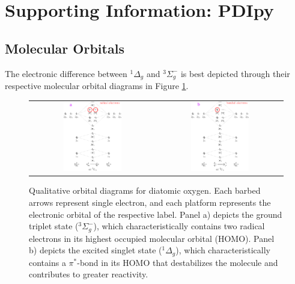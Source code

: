 \section{Supporting Information: PDIpy}

\subsection{Molecular Orbitals}
The electronic difference between $^1\Delta_g$ and $^3\Sigma_g^-$ is best depicted through their respective molecular orbital diagrams in Figure \ref{mo_diagrams}.

\begin{figure}
    \centering
    \begin{tabular}{c|c}
        \includegraphics[width = 0.48\textwidth]{images/PDIpy/background/triplet_mo_diagram.png}
        & \includegraphics[width = 0.48\textwidth]{images/PDIpy/background/singlet_mo_diagram.png}
    \end{tabular}
    \caption{
        Qualitative orbital diagrams for diatomic oxygen. Each barbed arrows represent single electron, and each platform represents the electronic orbital of the respective label. Panel a) depicts the ground triplet state ($^3\Sigma_g^-$), which characteristically contains two radical electrons in its highest occupied molecular orbital (HOMO). Panel b) depicts the excited singlet state ($^1\Delta_g$), which characteristically contains a $\pi^*$-bond in its HOMO that destabilizes the molecule and contributes to greater reactivity.
    }
    \label{mo_diagrams}
\end{figure}

